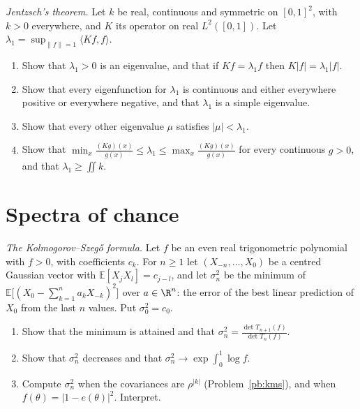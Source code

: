 \begin{exercise}[$\star\star\star$]\label{pb:jentzsch}
\emph{Jentzsch's theorem.} Let $k$ be real, continuous and symmetric on $[0,1]^2$, with $k>0$ everywhere, and $K$ its operator on real $L^2([0,1])$. Let $\lambda_1=\sup_{\|f\|=1}\langle Kf,f\rangle$.
\begin{enumerate}[label=(\alph*)]
\item Show that $\lambda_1>0$ is an eigenvalue, and that if $Kf=\lambda_1f$ then $K|f|=\lambda_1|f|$.
\item Show that every eigenfunction for $\lambda_1$ is continuous and either everywhere positive or everywhere negative, and that $\lambda_1$ is a simple eigenvalue.
\item Show that every other eigenvalue $\mu$ satisfies $|\mu|<\lambda_1$.
\item Show that $\min_x\frac{(Kg)(x)}{g(x)}\le\lambda_1\le\max_x\frac{(Kg)(x)}{g(x)}$ for every continuous $g>0$, and that $\lambda_1\ge\iint k$.
\end{enumerate}
\end{exercise}

\section{Spectra of chance}

\begin{exercise}[$\star\star\star$]\label{pb:prediction}
\emph{The Kolmogorov--Szegő formula.} Let $f$ be an even real trigonometric polynomial with $f>0$, with coefficients $c_k$. For $n\ge1$ let $(X_{-n},\dots,X_0)$ be a centred Gaussian
vector with $\mathbb E[X_jX_l]=c_{j-l}$, and let $\sigma_n^2$ be the minimum of $\mathbb E\bigl[(X_0-\sum_{k=1}^na_kX_{-k})^2\bigr]$ over $a\in\R^n$: the error of the best linear prediction of $X_0$ from the
last $n$ values. Put $\sigma_0^2=c_0$.
\begin{enumerate}[label=(\alph*)]
\item Show that the minimum is attained and that $\sigma_n^2=\frac{\det T_{n+1}(f)}{\det T_n(f)}$.
\item Show that $\sigma_n^2$ decreases and that $\sigma_n^2\to\exp\int_0^1\log f$.
\item Compute $\sigma_n^2$ when the covariances are $\rho^{|k|}$ (Problem~\ref{pb:kms}), and when $f(\theta)=|1-e(\theta)|^2$. Interpret.
\end{enumerate}
\end{exercise}

